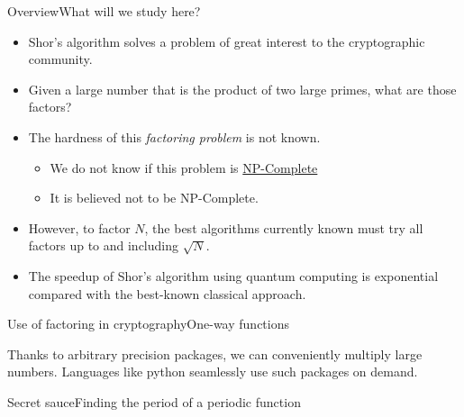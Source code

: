 
\begin{frame}{Overview}{What will we study here?}

\begin{itemize}
    \item Shor's algorithm solves a problem of great interest to the cryptographic community.
    \item Given a large number that is the product of two large primes, what are those factors?
    \item The hardness of this \emph{factoring problem} is not known.
    \begin{itemize}
        \item We do not know if this problem is \href{https://en.wikipedia.org/wiki/NP-completeness}{NP-Complete}
        \item It is believed not to be NP-Complete.
    \end{itemize}
    \item However, to factor $N$, the best algorithms currently known must try all factors up to and including $\sqrt{N}$.
    \item The speedup of Shor's algorithm using quantum computing is exponential compared with the best-known classical approach.
\end{itemize}
    
\end{frame}

\begin{frame}{Use of factoring in cryptography}{One-way functions}

\BigSkip{}%
Thanks to arbitrary precision packages, we can conveniently multiply large numbers.  Languages like python seamlessly use such packages on demand.
\end{frame}

\begin{frame}{Secret sauce}{Finding the period of a periodic function}

\TwoColumns{%
}{%
}
    
\end{frame}